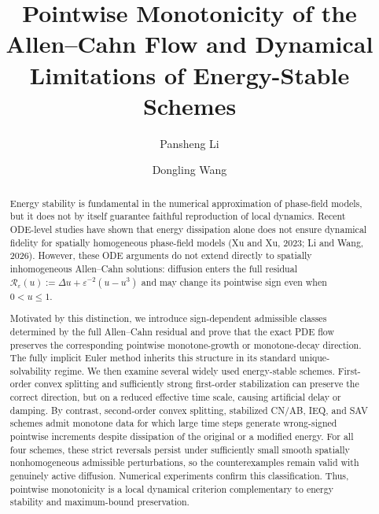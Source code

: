 \documentclass[final, 3p, times]{elsarticle}%
\def\corref#1{}%
\begin{document}
\raggedbottom
\begin{frontmatter}
\title{Pointwise Monotonicity of the Allen--Cahn Flow and Dynamical Limitations of Energy-Stable Schemes}



\author[XTU]{Pansheng Li}
\author[XTU]{Dongling Wang\corref{mycorrespondingauthor}}


\address[XTU]{Hunan Research Center of the Basic Discipline Fundamental Algorithmic Theory and Novel Computational Methods, National Center for Applied Mathematics in Hunan, School of Mathematics and Computational Science, Xiangtan University, Xiangtan 411105, Hunan, China}


\begin{abstract}


Energy stability is fundamental in the numerical approximation of phase-field models, but it does not by itself guarantee faithful reproduction of local dynamics. Recent ODE-level studies have shown that energy dissipation alone does not ensure dynamical fidelity for spatially homogeneous phase-field models (Xu and Xu, 2023; Li and Wang, 2026). However, these ODE arguments do not extend directly to spatially inhomogeneous Allen--Cahn solutions: diffusion enters the full residual $\mathcal R_\varepsilon(u):=\Delta u+\varepsilon^{-2}(u-u^3)$ and may change its pointwise sign even when $0<u\leq1$.

Motivated by this distinction, we introduce sign-dependent admissible classes determined by the full Allen--Cahn residual and prove that the exact PDE flow preserves the corresponding pointwise monotone-growth or monotone-decay direction. The fully implicit Euler method inherits this structure in its standard unique-solvability regime. We then examine several widely used energy-stable schemes. First-order convex splitting and sufficiently strong first-order stabilization can preserve the correct direction, but on a reduced effective time scale, causing artificial delay or damping. By contrast, second-order convex splitting, stabilized CN/AB, IEQ, and SAV schemes admit monotone data for which large time steps generate wrong-signed pointwise increments despite dissipation of the original or a modified energy. For all four schemes, these strict reversals persist under sufficiently small smooth spatially nonhomogeneous admissible perturbations, so the counterexamples remain valid with genuinely active diffusion. Numerical experiments confirm this classification. Thus, pointwise monotonicity is a local dynamical criterion complementary to energy stability and maximum-bound preservation.


\end{abstract}
\end{frontmatter}
\end{document}
